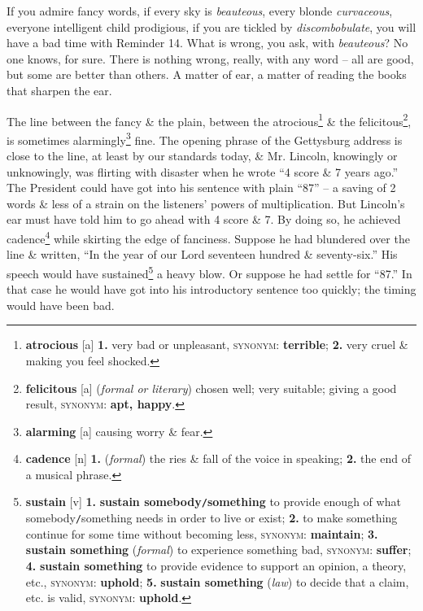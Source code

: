 \documentclass[oneside]{book}
\numberwithin{equation}{section}
\begin{document}
If you admire fancy words, if every sky is \textit{beauteous}, every blonde \textit{curvaceous}, everyone intelligent child prodigious, if you are tickled by \textit{discombobulate}, you will have a bad time with Reminder 14. What is wrong, you ask, with \textit{beauteous}? No one knows, for sure. There is nothing wrong, really, with any word -- all are good, but some are better than others. A matter of ear, a matter of reading the books that sharpen the ear.

The line between the fancy \& the plain, between the atrocious\footnote{\textbf{atrocious} [a] \textbf{1.} very bad or unpleasant, \textsc{synonym}: \textbf{terrible}; \textbf{2.} very cruel \& making you feel shocked.} \& the felicitous\footnote{\textbf{felicitous} [a] (\textit{formal or literary}) chosen well; very suitable; giving a good result, \textsc{synonym}: \textbf{apt, happy}.}, is sometimes alarmingly\footnote{\textbf{alarming} [a] causing worry \& fear.} fine. The opening phrase of the Gettysburg address is close to the line, at least by our standards today, \& Mr. Lincoln, knowingly or unknowingly, was flirting with disaster when he wrote ``4 score \& 7 years ago.'' The President could have got into his sentence with plain ``87'' -- a saving of 2 words \& less of a strain on the listeners' powers of multiplication. But Lincoln's ear must have told him to go ahead with 4 score \& 7. By doing so, he achieved cadence\footnote{\textbf{cadence} [n] \textbf{1.} (\textit{formal}) the ries \& fall of the voice in speaking; \textbf{2.} the end of a musical phrase.} while skirting the edge of fanciness. Suppose he had blundered over the line \& written, ``In the year of our Lord seventeen hundred \& seventy-six.'' His speech would have sustained\footnote{\textbf{sustain} [v] \textbf{1.} \textbf{sustain somebody\texttt{/}something} to provide enough of what somebody\texttt{/}something needs in order to live or exist; \textbf{2.} to make something continue for some time without becoming less, \textsc{synonym}: \textbf{maintain}; \textbf{3.} \textbf{sustain something} (\textit{formal}) to experience something bad, \textsc{synonym}: \textbf{suffer}; \textbf{4.} \textbf{sustain something} to provide evidence to support an opinion, a theory, etc., \textsc{synonym}: \textbf{uphold}; \textbf{5.} \textbf{sustain something} (\textit{law}) to decide that a claim, etc. is valid, \textsc{synonym}: \textbf{uphold}.} a heavy blow. Or suppose he had settle for ``87.'' In that case he would have got into his introductory sentence too quickly; the timing would have been bad.
\end{document}
